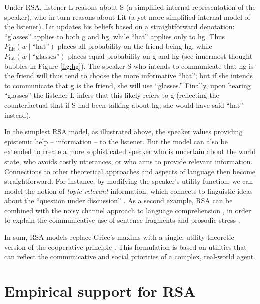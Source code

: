 \documentclass[]{elsarticle}
\begin{document}
Under RSA, listener L reasons about S (a simplified
internal representation of the speaker), who in turn reasons about Lit
(a yet more simplified internal model of the listener). Lit updates his
beliefs based on a straightforward denotation: ``glasses'' applies to
both {\sc g} and {\sc hg}, while ``hat'' applies only to {\sc hg}. Thus
$P_{\text{Lit}}(w\mid \text{``hat''})$ places all probability on the friend
being {\sc hg}, while $P_{\text{Lit}}(w\mid \text{``glasses''})$ places equal probability on {\sc g} and {\sc hg} (see innermost thought bubbles in Figure \ref{fig:hg}). The speaker S who intends to communicate that {\sc hg} is the friend will thus tend to choose the more informative ``hat''; but if she intends to communicate that {\sc g} is the friend, she will use ``glasses.'' Finally, upon hearing ``glasses'' the listener L infers that this likely refers to {\sc g} (reflecting the counterfactual that if S had been talking about {\sc hg}, she would have said ``hat'' instead).

In the simplest RSA model, as illustrated above, the speaker values
providing epistemic help -- information -- to the listener. But the model can also be extended to create a more sophisticated speaker who is uncertain
about the world state, who avoids costly utterances, or who aims to
provide relevant information. Connections to
other theoretical approaches and aspects of language then become
straightforward. For instance, by modifying the speaker's utility function, we can model the notion of \emph{topic-relevant} information, which
connects to linguistic ideas about the ``question under discussion''
\citep{roberts1996}.
As a second example, RSA can be combined with the noisy
channel approach to language comprehension \citep{levy2008},
in order to explain the communicative use of sentence fragments and prosodic stress \citep{bergen2015}.

In sum, RSA models replace Grice's maxims with a single, utility-theoretic version of the cooperative principle \citep{franke2016b}. 
This formulation is based on utilities that can reflect the communicative and social priorities of a complex, real-world agent.

\section{Empirical support for RSA}\label{empirical-support-for-rsa}
\end{document}
